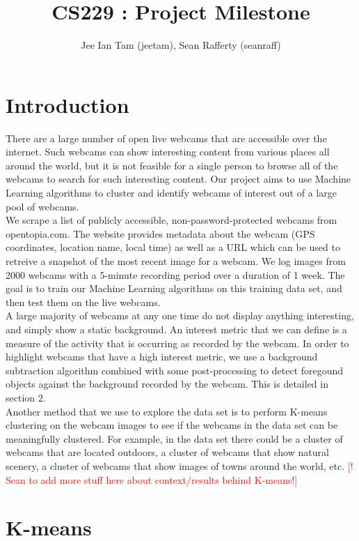 \documentclass{article}
\begin{document}
\title{CS229 : Project Milestone}
\author{Jee Ian Tam (jeetam), Sean Rafferty (seanraff)}

\section{Introduction}
There are a large number of open live webcams that are accessible over the internet. Such webcams can show interesting content from various places all around the world, but it is not feasible for a single person to browse all of the webcams to search for such interesting content. Our project aims to use Machine Learning algorithms to cluster and identify webcams of interest out of a large pool of webcams. \\

We scrape a list of publicly accessible, non-password-protected webcams from opentopia.com. The website provides metadata about the webcam (GPS coordinates, location name, local time) as well as a URL which can be used to retreive a snapshot of the most recent image for a webcam. We log images from 2000 webcams with a 5-minute recording period over a duration of 1 week. The goal is to train our Machine Learning algorithms on this training data set, and then test them on the live webcams. \\

A large majority of webcams at any one time do not display anything interesting, and simply show a static background. An interest metric that we can define is a measure of the activity that is occurring as recorded by the webcam. In order to highlight webcams that have a high interest metric, we use a background subtraction algorithm combined with some post-processing to detect foregound objects against the background recorded by the webcam. This is detailed in section 2. \\

Another method that we use to explore the data set is to perform K-means clustering on the webcam images to see if the webcams in the data set can be meaningfully clustered. For example, in the data set there could be a cluster of webcams that are located outdoors, a cluster of webcams that show natural scenery, a cluster of webcams that show images of towns around the world, etc. \textcolor{red}{[! Sean to add more stuff here about context/results behind K-means!]} \\ 

\section{K-means}
\end{document}
